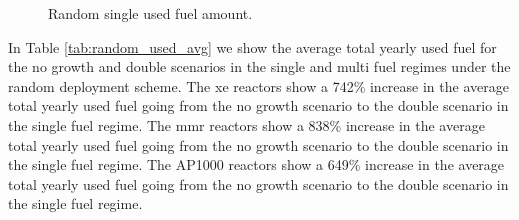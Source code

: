   \begin{figure}[H]
    \hfill
    \caption{Random single used fuel amount.}
    \label{fig:random_of_used}
\end{figure}


In Table \ref{tab:random_used_avg} we show the average total yearly used fuel for the no growth and double scenarios in the single and multi fuel regimes under the random deployment scheme. The \gls{xe} reactors show a 742\% increase in the average total yearly used fuel going from the no growth scenario to the double scenario in the single fuel regime. The \gls{mmr} reactors show a 838\% increase in the average total yearly used fuel going from the no growth scenario to the double scenario in the single fuel regime. The AP1000 reactors show a 649\% increase in the average total yearly used fuel going from the no growth scenario to the double scenario in the single fuel regime.

